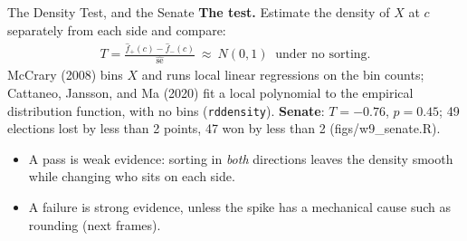\documentclass[aspectratio=169,11pt,xcolor=dvipsnames]{beamer}
\newcommand{\srcp}[1]{{\scriptsize\color{gray}(#1)}}
\newcommand{\srct}[1]{#1}
\begin{document}
\begin{frame}{The Density Test, and the Senate}
\textbf{The test.} Estimate the density of $X$ at $c$ separately from each side
and compare:
\begin{align*}
  T = \frac{\hat f_+(c) - \hat f_-(c)}{\widehat{\text{se}}} \ \approx\ N(0,1)
  \ \text{ under no sorting.}
\end{align*}
\srct{McCrary (2008)} bins $X$ and runs local linear regressions on the bin
counts; \srct{Cattaneo, Jansson, and Ma (2020)} fit a local polynomial to the
empirical distribution function, with no bins (\texttt{rddensity}).
\vskip3pt
\textbf{Senate}: $T = -0.76$, $p = 0.45$; 49 elections lost by less than 2
points, 47 won by less than 2 \srcp{figs/w9\_senate.R}.
\vskip3pt
\begin{itemize}\itemsep2pt
  \item A pass is weak evidence: sorting in \emph{both} directions leaves the
        density smooth while changing who sits on each side.
  \item A failure is strong evidence, unless the spike has a mechanical cause
        such as rounding (next frames).
\end{itemize}
\end{frame}
\end{document}
